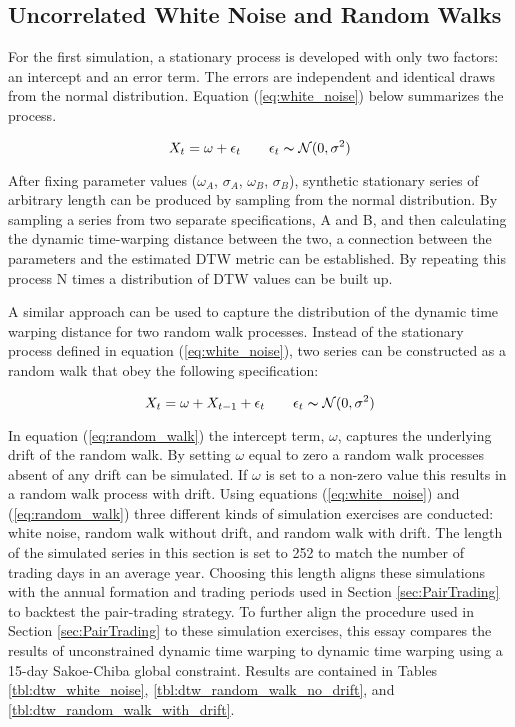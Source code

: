 \subsection{Uncorrelated White Noise and Random Walks} \label{sec:Uncorrelated_white_noise}

For the first simulation, a stationary process is developed with only two factors: an intercept and an error term. The errors are independent and identical draws from the normal distribution. Equation (\ref{eq:white_noise}) below summarizes the process.

\begin{equation} \label{eq:white_noise}
    X_{t} = \omega + \epsilon_{t} \qquad \epsilon_{t} \thicksim \mathcal{N}(0, \sigma^{2})
\end{equation}

After fixing parameter values ($\omega_{A}$, $\sigma_{A}$, $\omega_{B}$, $\sigma_{B}$), synthetic stationary series of arbitrary length can be produced by sampling from the normal distribution. By sampling a series from two separate specifications, A and B, and then calculating the dynamic time-warping distance between the two, a connection between the parameters and the estimated DTW metric can be established. By repeating this process N times a distribution of DTW values can be built up.

A similar approach can be used to capture the distribution of the dynamic time warping distance for two random walk processes. Instead of the stationary process defined in equation (\ref{eq:white_noise}), two series can be constructed as a random walk that obey the following specification:

\begin{equation} \label{eq:random_walk}
    X_{t} = \omega + X_{t-1} + \epsilon_{t} \qquad \epsilon_{t} \thicksim \mathcal{N}(0, \sigma^{2})
\end{equation}

In equation (\ref{eq:random_walk}) the intercept term, $\omega$, captures the underlying drift of the random walk. By setting $\omega$ equal to zero a random walk processes absent of any drift can be simulated. If $\omega$ is set to a non-zero value this results in a random walk process with drift. Using equations (\ref{eq:white_noise}) and (\ref{eq:random_walk}) three different kinds of simulation exercises are conducted: white noise, random walk without drift, and random walk with drift. The length of the simulated series in this section is set to 252 to match the number of trading days in an average year. Choosing this length aligns these simulations with the annual formation and trading periods used in Section \ref{sec:PairTrading} to backtest the pair-trading strategy. To further align the procedure used in Section \ref{sec:PairTrading} to these simulation exercises, this essay compares the results of unconstrained dynamic time warping to dynamic time warping using a 15-day Sakoe-Chiba global constraint. Results are contained in Tables \ref{tbl:dtw_white_noise}, \ref{tbl:dtw_random_walk_no_drift}, and \ref{tbl:dtw_random_walk_with_drift}.

